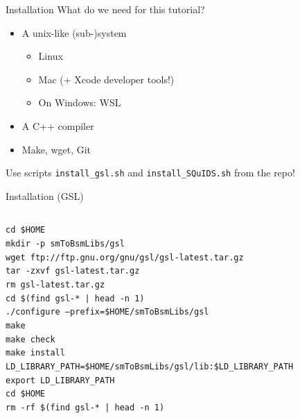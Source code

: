 \documentclass[]{beamer}
\begin{document}
\begin{frame}{Installation}
  What do we need for this tutorial?
  \begin{itemize}
    \item A unix-like (sub-)system 
    \begin{itemize}
      \item Linux
      \item Mac (+ Xcode developer tools!)
      \item On Windows: WSL
    \end{itemize}
    \item A C++ compiler
    \item Make, wget, Git
  \end{itemize}
  Use scripts \texttt{install\_gsl.sh} and \texttt{install\_SQuIDS.sh} from the repo!
\end{frame}

\begin{frame}{Installation (GSL)}
  \begin{columns}
    \begin{column}{\textwidth}
      {\tiny
        \begin{tcolorbox}[colback=gray!5!white]
        \texttt{cd \$HOME} \\
        \texttt{mkdir -p smToBsmLibs/gsl} \\
        \texttt{wget ftp://ftp.gnu.org/gnu/gsl/gsl-latest.tar.gz} \\
        \texttt{tar -zxvf gsl-latest.tar.gz} \\
        \texttt{rm gsl-latest.tar.gz} \\
        \texttt{cd \$(find gsl-* | head -n 1)} \\
        \texttt{./configure --prefix=\$HOME/smToBsmLibs/gsl} \\
        \texttt{make} \\
        \texttt{make check} \\
        \texttt{make install} \\
        \texttt{LD\_LIBRARY\_PATH=\$HOME/smToBsmLibs/gsl/lib:\$LD\_LIBRARY\_PATH} \\
        \texttt{export LD\_LIBRARY\_PATH} \\
        \texttt{cd \$HOME} \\
        \texttt{rm -rf \$(find gsl-* | head -n 1)}
      \end{tcolorbox}}
    \end{column}
  \end{columns}
\end{frame}
\end{document}

